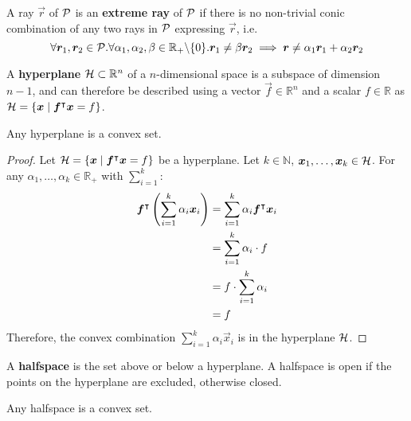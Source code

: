 \begin{definition}
A ray $\vec{r}$ of $\mathcal{P}$ is an \textbf{extreme ray} of $\mathcal{P}$ if there is no non-trivial conic combination of any two rays in $\mathcal{P}$ expressing $\vec{r}$, i.e.
\begin{equation*}
\forall {\bm{r}}_1, {\bm{r}}_2 \in \mathcal{P}. \forall \alpha_1, \alpha_2, \beta \in \mathbb{R}_+ \backslash \{0\}. {\bm{r}}_1 \neq \beta {\bm{r}}_2 \implies {\bm{r}} \neq \alpha_1 {\bm{r}}_1 + \alpha_2 {\bm{r}}_2
\end{equation*}
\end{definition}

\begin{definition}
A \textbf{hyperplane} $\mathcal{H} \subset \mathbb{R}^n$ of a $n$-dimensional space is a subspace of dimension $n-1$, and can therefore be described using a vector $\vec{f} \in \mathbb{R}^n$ and a scalar $f \in \mathbb{R}$ as $\mathcal{H} = \{{\bm{x}} \mid {\bm{f}}^\intercal {\bm{x}} = f\}$.
\end{definition}

\begin{corollary}
Any hyperplane is a convex set.
\end{corollary}

\begin{proof}
Let $\mathcal{H} = \{{\bm{x}} \mid {\bm{f}}^\intercal {\bm{x}} = f\}$ be a hyperplane. Let $k \in \mathbb{N}$, ${\bm{x}}_1, \dots, {\bm{x}}_k \in \mathcal{H}$. For any $\alpha_1, \dots, \alpha_k \in \mathbb{R}_+$ with $\sum_{i=1}^{k}$:
\begin{align*}
{\bm{f}}^\intercal \left( \sum_{i=1}^{k} \alpha_i {\bm{x}}_i \right)
&= \sum_{i=1}^{k} \alpha_i {\bm{f}}^\intercal {\bm{x}}_i \\
&= \sum_{i=1}^{k} \alpha_i \cdot f \\
&= f \cdot \sum_{i=1}^{k} \alpha_i \\
&= f
\end{align*}
Therefore, the convex combination $\sum_{i=1}^{k} \alpha_i \vec{x}_i$ is in the hyperplane $\mathcal{H}$.
\end{proof}

\begin{definition}
A \textbf{halfspace} is the set above or below a hyperplane. A halfspace is open if the points on the hyperplane are excluded, otherwise closed.
\end{definition}

\begin{corollary}\label{cor:halfspace_convex}
Any halfspace is a convex set.
\end{corollary}

